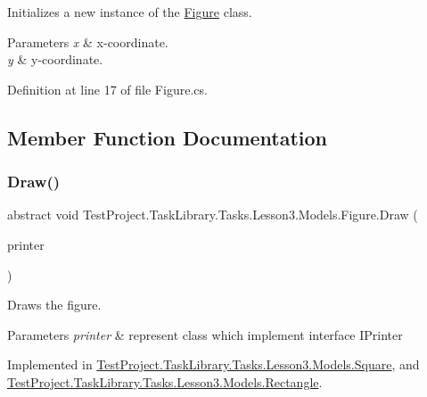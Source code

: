 Initializes a new instance of the \mbox{\hyperlink{class_test_project_1_1_task_library_1_1_tasks_1_1_lesson3_1_1_models_1_1_figure}{Figure}} class. 


\begin{DoxyParams}{Parameters}
{\em x} & x-\/coordinate.\\
\hline
{\em y} & y-\/coordinate.\\
\hline
\end{DoxyParams}


Definition at line 17 of file Figure.\+cs.



\subsection{Member Function Documentation}
\mbox{\label{class_test_project_1_1_task_library_1_1_tasks_1_1_lesson3_1_1_models_1_1_figure_ab736419f3c4dbf51aa758b3d38c10e88}} 
\subsubsection{\texorpdfstring{Draw()}{Draw()}}
{\footnotesize\ttfamily abstract void Test\+Project.\+Task\+Library.\+Tasks.\+Lesson3.\+Models.\+Figure.\+Draw (\begin{DoxyParamCaption}\item[{I\+Printer}]{printer }\end{DoxyParamCaption})\hspace{0.3cm}{\ttfamily [pure virtual]}}



Draws the figure. 


\begin{DoxyParams}{Parameters}
{\em printer} & represent class which implement interface I\+Printer\\
\hline
\end{DoxyParams}


Implemented in \mbox{\hyperlink{class_test_project_1_1_task_library_1_1_tasks_1_1_lesson3_1_1_models_1_1_square_a7dc600c3d04a796aeddfa93477422de7}{Test\+Project.\+Task\+Library.\+Tasks.\+Lesson3.\+Models.\+Square}}, and \mbox{\hyperlink{class_test_project_1_1_task_library_1_1_tasks_1_1_lesson3_1_1_models_1_1_rectangle_aba1c4aa1b28737fedd2bd3456bd6100e}{Test\+Project.\+Task\+Library.\+Tasks.\+Lesson3.\+Models.\+Rectangle}}.



